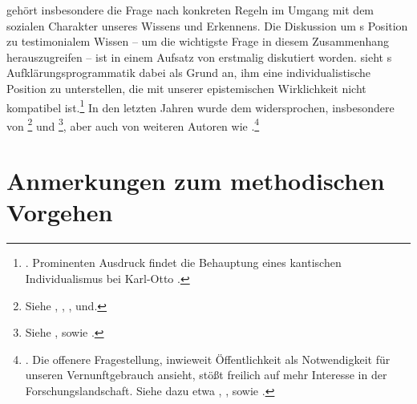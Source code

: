 gehört insbesondere die Frage nach konkreten Regeln im Umgang mit dem sozialen
Charakter unseres Wissens und Erkennens. Die Diskussion um
s Position zu testimonialem Wissen -- um die wichtigste
Frage in diesem Zusammenhang herauszugreifen -- ist in einem 
Aufsatz von 
erstmalig diskutiert worden.
 sieht
s Aufklärungsprogrammatik dabei als Grund an, ihm eine
individualistische Position zu unterstellen, die mit unserer epistemischen
Wirklichkeit nicht kompatibel
ist.\footnote{\cite[Vgl.][46]{Schmitt:JustificationSocialityandAutonomy1987}.
Prominenten Ausdruck findet die Behauptung eines kantischen Individualismus bei Karl-Otto
\textcite[][passim]{Apel:DasAprioriderKommunikationsgemeinschaft1976}.} In den
letzten Jahren wurde dem widersprochen, insbesondere von
\footnote{Siehe
\cite{Scholz:AutonomieangesichtsepistemischerAbhaengigkeiten2001},
\cite{Scholz:DasZeugnisanderer2001},
\cite{Scholz:enquotedotsdenoberstenProbiersteinderWahrheitinsichselbstd.i.inseinereigenenVernunftsuchen2004},
und\cite{Scholz:Aufklaerung:VonderErkenntnistheoriezurPolitik2006}.} und
\footnote{Siehe \cite{Gelfert:KantonTestimony2006}, sowie
\cite{Gelfert:KantandtheEnlightenmentsContributiontoSocialEpistemology2010}.},
aber auch von weiteren Autoren wie
.\footnote{\cite[Vgl.][]{Mikalsen:TestimonyandKantsIdeaofPublicReason2010}.
Die offenere Fragestellung, inwieweit  Öffentlichkeit als
Notwendigkeit für unseren Vernunftgebrauch ansieht, stößt freilich auf mehr
Interesse in der Forschungslandschaft. Siehe dazu etwa
\cite{Hoeffe:EinerepublikanischeVernunft1996},
\cite{Deligiorgi:UniversalisabilityPublicitaandCommunication2002}, sowie
\cite{Deligiorgi:KantandtheCultureofEnlightenment2005}.}

\section{Anmerkungen zum methodischen Vorgehen}

